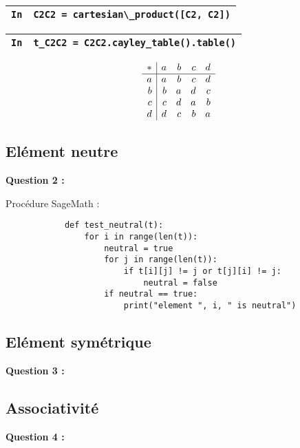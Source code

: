 \documentclass[titlepage]{article}
\begin{document}
        \begin{tabularx}{11.5cm}{|p{0.60cm}|X|}
            \hline
            \verb|In|
            & 
            \verb|C2C2 = cartesian\_product([C2, C2])|
            \\
            \hline
        \end{tabularx}
            
        \begin{tabularx}{11.5cm}{|p{0.60cm}|X|}
            \hline
            \verb|In|
            & 
            \verb|t_C2C2 = C2C2.cayley_table().table()|
            \\
            \hline
        \end{tabularx}

        {\setlength{\arraycolsep}{2ex}
        \[\begin{array}{r|*{4}{r}}
            \multicolumn{1}{c|}{\ast}&a&b&c&d\\\hline
            {}a&a&b&c&d\\
            {}b&b&a&d&c\\
            {}c&c&d&a&b\\
            {}d&d&c&b&a\\
        \end{array}\]}

        \subsection{Elément neutre}
        \textbf{Question 2 :}
        
        Procédure SageMath :
        \begin{lstlisting}
            def test_neutral(t):
                for i in range(len(t)):
                    neutral = true
                    for j in range(len(t)):
                        if t[i][j] != j or t[j][i] != j:
                            neutral = false
                    if neutral == true:
                        print("element ", i, " is neutral")
        \end{lstlisting}
        

        \subsection{Elément symétrique}
        \textbf{Question 3 :}
        \subsection{Associativité}
        \textbf{Question 4 :}
\end{document}
